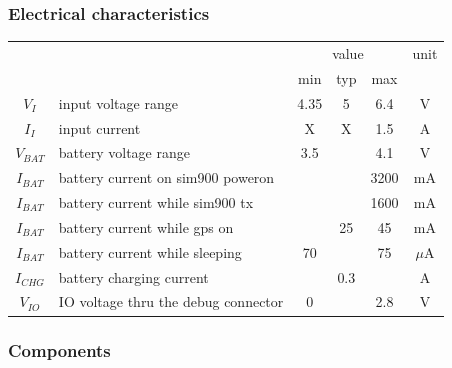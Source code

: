 \documentclass[a4paper,twoside]{refart}
\begin{document}
\subsubsection{Electrical characteristics}

\begin{tabular}{ |c|l|c|c|c|c| }
    \hline
    \multicolumn{2}{|c|}{} & \multicolumn{3}{|c|}{value} & unit \\ \cline{3-6}
    \multicolumn{2}{|c|}{} & min & typ & max & \\ \hline
    $V_{I}$ & input voltage range                      & 4.35  & 5     & 6.4  & V \\ \hline
    $I_{I}$ & input current                            & X     & X     & 1.5  & A \\ \hline
    $V_{BAT}$ & battery voltage range                  & 3.5   &       & 4.1  & V \\ \hline
    $I_{BAT}$ & battery current on sim900 poweron      &       &       & 3200 & mA \\ \hline
    $I_{BAT}$ & battery current while sim900 tx        &       &       & 1600 & mA \\ \hline
    $I_{BAT}$ & battery current while gps on           &       & 25    & 45   & mA \\ \hline
    $I_{BAT}$ & battery current while sleeping         & 70    &       & 75   & $\mu$A \\ \hline
    $I_{CHG}$ & battery charging current \footnotemark &       & 0.3   &   & A \\ \hline
    $V_{IO}$ & IO voltage thru the debug connector     & 0     &       & 2.8  & V \\ \hline
\end{tabular}




\subsubsection{Components}
\end{document}
